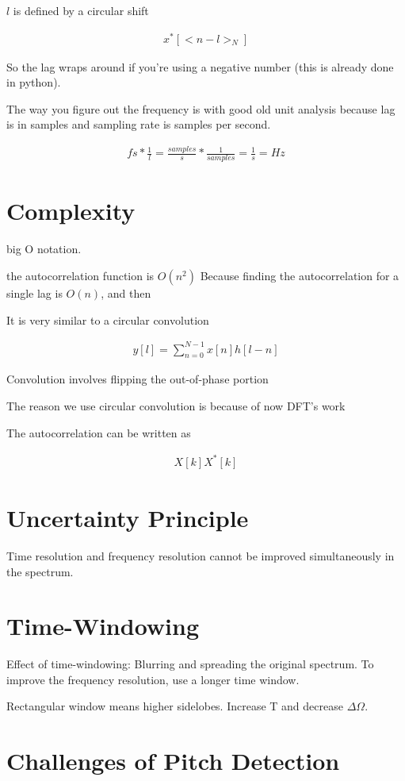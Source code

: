 \documentclass[fleqn]{report}
\newcommand{\equations} [1] {
\begin{gather*}
#1
\end{gather*}
}
\begin{document}
$l$ is defined by a circular shift 
\equations{
    x^*[<n-l>_N]
}
So the lag wraps around if you're using a negative number 
(this is already done in python).

The way you figure out the frequency is with good old unit 
analysis because lag is in samples and sampling rate is samples per second.
\equations{
    fs * \frac{1}{l}
    =
    \frac{samples}{s}
    *
    \frac{1}{samples}
    =
    \frac{1}{s}
    =
    Hz
}

\section{Complexity}
big O notation. 

the autocorrelation function is $O(n^2)$ 
Because finding the autocorrelation for a single lag is $O(n)$, 
and then 

It is very similar to a circular convolution 
\equations{
    y[l]
    =
    \sum_{n=0}^{N-1}
    x[n] h[l-n]
}

Convolution involves flipping the out-of-phase portion 

The reason we use circular convolution is because of now DFT's work 

The autocorrelation can be written as 
\equations{
    X[k] X^*[k]
}

\section{Uncertainty Principle}
Time resolution and frequency resolution
cannot be improved simultaneously
in the spectrum.

\section{Time-Windowing}
Effect of time-windowing: Blurring and spreading the original spectrum.
To improve the frequency resolution, use a longer time window.

Rectangular window means higher sidelobes. Increase T and decrease 
$\Delta \Omega$.

\section{Challenges of Pitch Detection}
\end{document}
